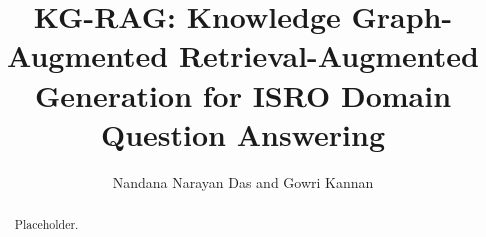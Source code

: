 \documentclass{IEEEtran}
\begin{document}
\title{KG-RAG: Knowledge Graph-Augmented Retrieval-Augmented Generation for ISRO Domain Question Answering}
\author{Nandana Narayan Das and Gowri Kannan}
\maketitle
\begin{abstract}
Placeholder.
\end{abstract}
\end{document}

